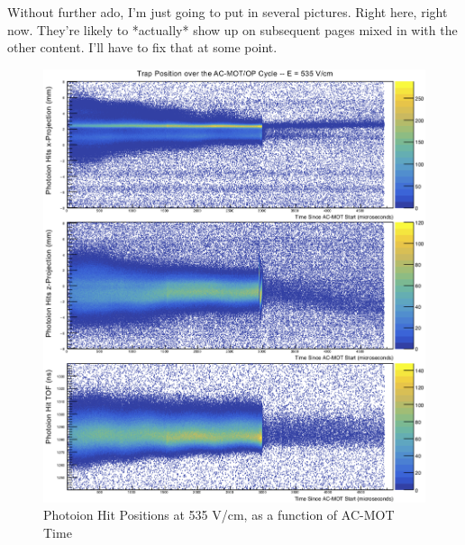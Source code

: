 Without further ado, I'm just going to put in several pictures.  Right here, right now.  They're likely to *actually* show up on subsequent pages mixed in with the other content.  I'll have to fix that at some point.
\begin{figure}[h!!t]
	\centering
	\includegraphics[width=.999\linewidth]
	{Figures/rMCP_xyz_vs_acmottime.png}
	\caption[Photoion Hit Positions at 535 V/cm, as a function of AC-MOT Time]{Photoion Hit Positions at 535 V/cm, as a function of AC-MOT Time}	
\end{figure}


